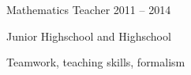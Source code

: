 \begin{cventries}




	\cventrysix
	{} %
	{Mathematics Teacher} %
	{} %
	{2011 -- 2014} %
	{
		\begin{cvitems} %
			\item {Junior Highschool and Highschool}
		\end{cvitems}
	}%
	{Teamwork, teaching skills, formalism}



\end{cventries}
